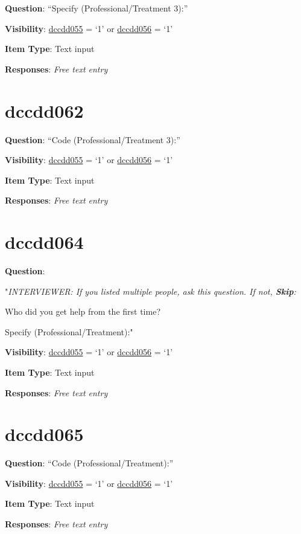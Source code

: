 \documentclass[]{book}
\begin{document}
\textbf{Question}: ``Specify (Professional/Treatment 3):''

\textbf{Visibility}: \protect\hyperlink{dccdd055}{dccdd055} = `1' or \protect\hyperlink{dccdd056}{dccdd056} = `1'

\textbf{Item Type}: Text input

\textbf{Responses}: \emph{Free text entry}

\hypertarget{dccdd062}{%
\section{dccdd062}\label{dccdd062}}

\textbf{Question}: ``Code (Professional/Treatment 3):''

\textbf{Visibility}: \protect\hyperlink{dccdd055}{dccdd055} = `1' or \protect\hyperlink{dccdd056}{dccdd056} = `1'

\textbf{Item Type}: Text input

\textbf{Responses}: \emph{Free text entry}

\hypertarget{dccdd064}{%
\section{dccdd064}\label{dccdd064}}

\textbf{Question}:

"\emph{INTERVIEWER: If you listed multiple people, ask this question. If not, \textbf{Skip}:}

Who did you get help from the first time?

Specify (Professional/Treatment):"

\textbf{Visibility}: \protect\hyperlink{dccdd055}{dccdd055} = `1' or \protect\hyperlink{dccdd056}{dccdd056} = `1'

\textbf{Item Type}: Text input

\textbf{Responses}: \emph{Free text entry}

\hypertarget{dccdd065}{%
\section{dccdd065}\label{dccdd065}}

\textbf{Question}: ``Code (Professional/Treatment):''

\textbf{Visibility}: \protect\hyperlink{dccdd055}{dccdd055} = `1' or \protect\hyperlink{dccdd056}{dccdd056} = `1'

\textbf{Item Type}: Text input

\textbf{Responses}: \emph{Free text entry}
\end{document}
